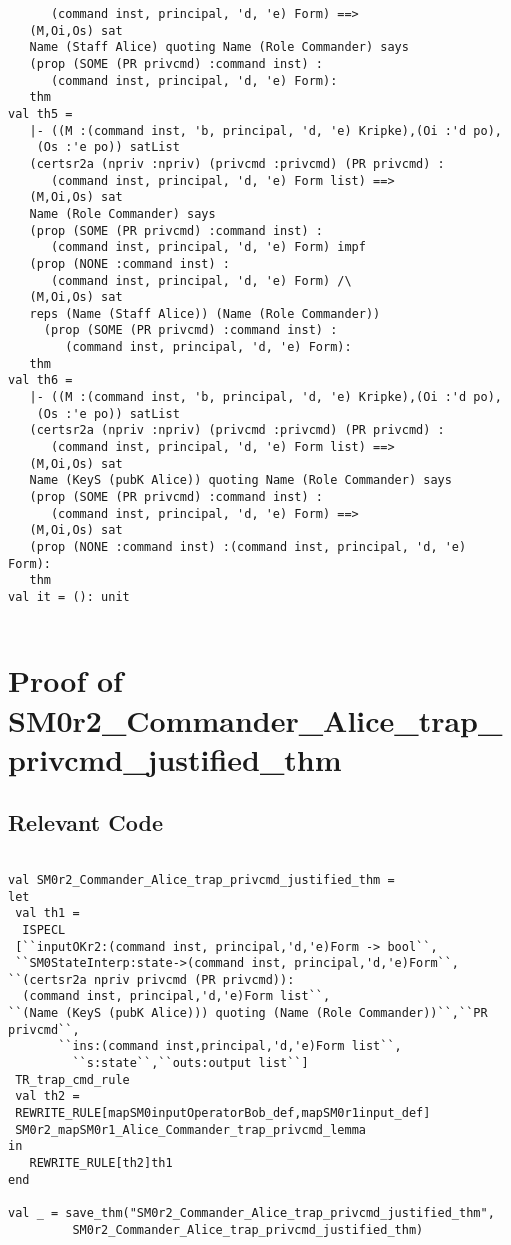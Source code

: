 \documentclass{report}
\begin{document}
\begin{session}
\begin{scriptsize}
\begin{verbatim}
      (command inst, principal, 'd, 'e) Form) ==>
   (M,Oi,Os) sat
   Name (Staff Alice) quoting Name (Role Commander) says
   (prop (SOME (PR privcmd) :command inst) :
      (command inst, principal, 'd, 'e) Form):
   thm
val th5 =
   |- ((M :(command inst, 'b, principal, 'd, 'e) Kripke),(Oi :'d po),
    (Os :'e po)) satList
   (certsr2a (npriv :npriv) (privcmd :privcmd) (PR privcmd) :
      (command inst, principal, 'd, 'e) Form list) ==>
   (M,Oi,Os) sat
   Name (Role Commander) says
   (prop (SOME (PR privcmd) :command inst) :
      (command inst, principal, 'd, 'e) Form) impf
   (prop (NONE :command inst) :
      (command inst, principal, 'd, 'e) Form) /\
   (M,Oi,Os) sat
   reps (Name (Staff Alice)) (Name (Role Commander))
     (prop (SOME (PR privcmd) :command inst) :
        (command inst, principal, 'd, 'e) Form):
   thm
val th6 =
   |- ((M :(command inst, 'b, principal, 'd, 'e) Kripke),(Oi :'d po),
    (Os :'e po)) satList
   (certsr2a (npriv :npriv) (privcmd :privcmd) (PR privcmd) :
      (command inst, principal, 'd, 'e) Form list) ==>
   (M,Oi,Os) sat
   Name (KeyS (pubK Alice)) quoting Name (Role Commander) says
   (prop (SOME (PR privcmd) :command inst) :
      (command inst, principal, 'd, 'e) Form) ==>
   (M,Oi,Os) sat
   (prop (NONE :command inst) :(command inst, principal, 'd, 'e) Form):
   thm
val it = (): unit


\end{verbatim}
  \end{scriptsize}
\end{session}

\section{Proof of SM0r2_Commander_Alice_trap_privcmd_justified_thm}
\label{proof-2}

\subsection{Relevant Code}
\label{rel-code-2}
\begin{lstlisting}[frame=TBlr]

val SM0r2_Commander_Alice_trap_privcmd_justified_thm =
let
 val th1 =
  ISPECL
 [``inputOKr2:(command inst, principal,'d,'e)Form -> bool``,
 ``SM0StateInterp:state->(command inst, principal,'d,'e)Form``,
``(certsr2a npriv privcmd (PR privcmd)):
  (command inst, principal,'d,'e)Form list``,
``(Name (KeyS (pubK Alice))) quoting (Name (Role Commander))``,``PR privcmd``,
	   ``ins:(command inst,principal,'d,'e)Form list``,
	     ``s:state``,``outs:output list``]
 TR_trap_cmd_rule
 val th2 =
 REWRITE_RULE[mapSM0inputOperatorBob_def,mapSM0r1input_def]
 SM0r2_mapSM0r1_Alice_Commander_trap_privcmd_lemma
in 
   REWRITE_RULE[th2]th1
end

val _ = save_thm("SM0r2_Commander_Alice_trap_privcmd_justified_thm",
         SM0r2_Commander_Alice_trap_privcmd_justified_thm)


\end{lstlisting}
\end{document}
